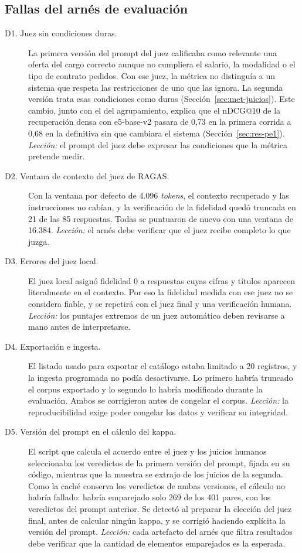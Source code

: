 \subsection{Fallas del arnés de evaluación}

\begin{description}
    \item[D1. Juez sin condiciones duras.] La primera versión del prompt del juez calificaba como relevante una oferta del cargo correcto aunque no cumpliera el salario, la modalidad o el tipo de contrato pedidos. Con ese juez, la métrica no distinguía a un sistema que respeta las restricciones de uno que las ignora. La segunda versión trata esas condiciones como duras (Sección~\ref{sec:met-juicios}). Este cambio, junto con el del agrupamiento, explica que el nDCG@10 de la recuperación densa con e5-base-v2 pasara de 0,73 en la primera corrida a 0,68 en la definitiva sin que cambiara el sistema (Sección~\ref{sec:res-pe1}). \emph{Lección:} el prompt del juez debe expresar las condiciones que la métrica pretende medir.
    \item[D2. Ventana de contexto del juez de RAGAS.] Con la ventana por defecto de 4.096 \textit{tokens}, el contexto recuperado y las instrucciones no cabían, y la verificación de la fidelidad quedó truncada en 21 de las 85 respuestas. Todas se puntuaron de nuevo con una ventana de 16.384. \emph{Lección:} el arnés debe verificar que el juez recibe completo lo que juzga.
    \item[D3. Errores del juez local.] El juez local asignó fidelidad 0 a respuestas cuyas cifras y títulos aparecen literalmente en el contexto. Por eso la fidelidad medida con ese juez no se considera fiable, y se repetirá con el juez final y una verificación humana. \emph{Lección:} los puntajes extremos de un juez automático deben revisarse a mano antes de interpretarse.
    \item[D4. Exportación e ingesta.] El listado usado para exportar el catálogo estaba limitado a 20 registros, y la ingesta programada no podía desactivarse. Lo primero habría truncado el corpus exportado y lo segundo lo habría modificado durante la evaluación. Ambos se corrigieron antes de congelar el corpus. \emph{Lección:} la reproducibilidad exige poder congelar los datos y verificar su integridad.
    \item[D5. Versión del prompt en el cálculo del kappa.] El script que calcula el acuerdo entre el juez y los juicios humanos seleccionaba los veredictos de la primera versión del prompt, fijada en su código, mientras que la muestra se extrajo de los juicios de la segunda. Como la caché conserva los veredictos de ambas versiones, el cálculo no habría fallado: habría emparejado solo 269 de los 401 pares, con los veredictos del prompt anterior. Se detectó al preparar la elección del juez final, antes de calcular ningún kappa, y se corrigió haciendo explícita la versión del prompt. \emph{Lección:} cada artefacto del arnés que filtra resultados debe verificar que la cantidad de elementos emparejados es la esperada.

\end{description}
